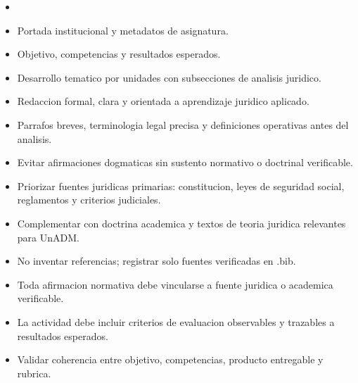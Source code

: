 \documentclass[12pt]{article}
\begin{document}
\begin{itemize}[leftmargin=*]
  \item \\%
  \item Portada institucional y metadatos de asignatura.
  \item Objetivo, competencias y resultados esperados.
  \item Desarrollo tematico por unidades con subsecciones de analisis juridico.
  \item Redaccion formal, clara y orientada a aprendizaje juridico aplicado.
  \item Parrafos breves, terminologia legal precisa y definiciones operativas antes del analisis.
  \item Evitar afirmaciones dogmaticas sin sustento normativo o doctrinal verificable.
  \item Priorizar fuentes juridicas primarias: constitucion, leyes de seguridad social, reglamentos y criterios judiciales.
  \item Complementar con doctrina academica y textos de teoria juridica relevantes para UnADM.
  \item No inventar referencias; registrar solo fuentes verificadas en .bib.
  \item Toda afirmacion normativa debe vincularse a fuente juridica o academica verificable.
  \item La actividad debe incluir criterios de evaluacion observables y trazables a resultados esperados.
  \item Validar coherencia entre objetivo, competencias, producto entregable y rubrica.
\end{itemize}
\end{document}

